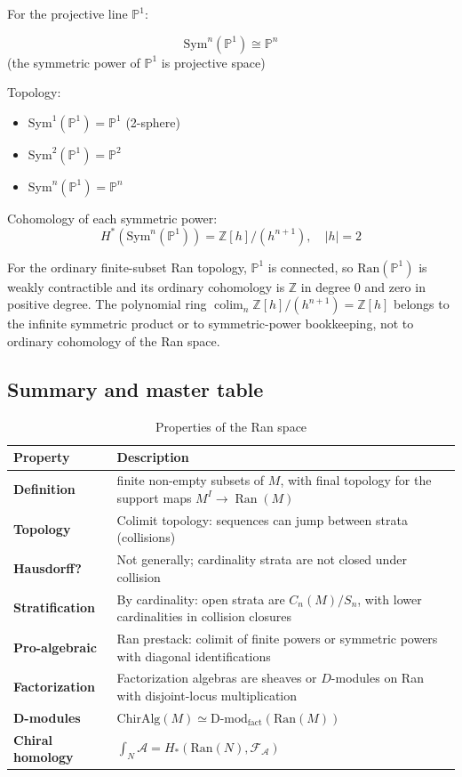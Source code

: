 \begin{example}
\label{ex:ran-P1}
For the projective line $\mathbb{P}^1$:

\[\text{Sym}^n(\mathbb{P}^1) \cong \mathbb{P}^n\]
(the symmetric power of $\mathbb{P}^1$ is projective space)

Topology:
\begin{itemize}
\item $\text{Sym}^1(\mathbb{P}^1) = \mathbb{P}^1$ (2-sphere)
\item $\text{Sym}^2(\mathbb{P}^1) = \mathbb{P}^2$
\item $\text{Sym}^n(\mathbb{P}^1) = \mathbb{P}^n$
\end{itemize}

Cohomology of each symmetric power:
\[H^*(\text{Sym}^n(\mathbb{P}^1)) = \mathbb{Z}[h]/(h^{n+1}), \quad |h| = 2\]

For the ordinary finite-subset Ran topology, $\mathbb P^1$ is connected,
so $\text{Ran}(\mathbb P^1)$ is weakly contractible and its ordinary
cohomology is $\mathbb Z$ in degree $0$ and zero in positive degree. The
polynomial ring
$\operatorname{colim}_n\mathbb Z[h]/(h^{n+1})=\mathbb Z[h]$ belongs to
the infinite symmetric product or to symmetric-power bookkeeping, not to
ordinary cohomology of the Ran space.
\end{example}

\subsection{Summary and master table}

\begin{table}[H]
\centering
\caption{Properties of the Ran space}
\begin{tabular}{|l|p{8cm}|}
\hline
\textbf{Property} & \textbf{Description} \\
\hline
\textbf{Definition} & finite non-empty subsets of $M$, with final
topology for the support maps $M^I\to\operatorname{Ran}(M)$ \\
\hline
\textbf{Topology} & Colimit topology: sequences can jump between strata (collisions) \\
\hline
\textbf{Hausdorff?} & Not generally; cardinality strata are not closed under collision \\
\hline
\textbf{Stratification} & By cardinality: open strata are
$C_n(M)/S_n$, with lower cardinalities in collision closures \\
\hline
\textbf{Pro-algebraic} & Ran prestack: colimit of finite powers or
symmetric powers with diagonal identifications \\
\hline
\textbf{Factorization} & Factorization algebras are sheaves or
$D$-modules on Ran with disjoint-locus multiplication \\
\hline
\textbf{D-modules} & $\text{ChirAlg}(M) \simeq \text{D-mod}_{\text{fact}}(\text{Ran}(M))$ \\
\hline
\textbf{Chiral homology} & $\int_N \mathcal{A} = H_*(\text{Ran}(N), \mathcal{F}_{\mathcal{A}})$ \\
\hline
\end{tabular}
\end{table}

